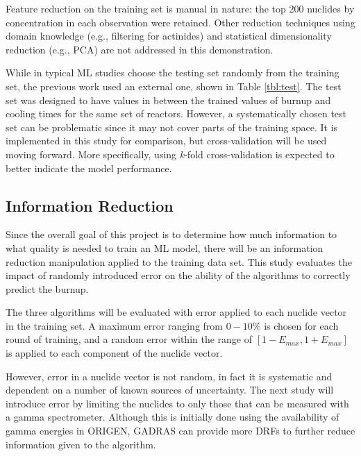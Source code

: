 Feature reduction on the training set is manual in nature: the top 200 nuclides
by concentration in each observation were retained. Other reduction techniques
using domain knowledge (e.g., filtering for actinides) and statistical
dimensionality reduction (e.g., \gls{PCA}) are not addressed in this
demonstration.

While in typical \gls{ML} studies choose the testing set randomly from
the training set, the previous work used an external one, shown in Table
\ref{tbl:test}.  The test set was designed to have values in between the
trained values of burnup and cooling times for the same set of reactors.
However, a systematically chosen test set can be problematic since it may not
cover parts of the training space.  It is implemented in this study for
comparison, but cross-validation will be used moving forward. More
specifically, using \textit{k}-fold cross-validation is expected to better
indicate the model performance. 

\subsection{Information Reduction}
\label{sec:inforeduc}

Since the overall goal of this project is to determine how much information to
what quality is needed to train an \gls{ML} model, there will be an
information reduction manipulation applied to the training data set. This study
evaluates the impact of randomly introduced error on the ability of the
algorithms to correctly predict the burnup. 

The three algorithms will be evaluated with error applied to each nuclide
vector in the training set.  A maximum error ranging from $0 - 10\%$ is chosen
for each round of training, and a random error within the range of $[1-E_{max},
1+E_{max}]$ is applied to each component of the nuclide vector.

However, error in a nuclide vector is not random, in fact it is systematic and
dependent on a number of known sources of uncertainty. The next study will
introduce error by limiting the nuclides to only those that can be measured
with a gamma spectrometer. Although this is initially done using the
availability of gamma energies in \gls{ORIGEN}, \gls{GADRAS} can provide more
\gls{DRF}s to further reduce information given to the algorithm.

